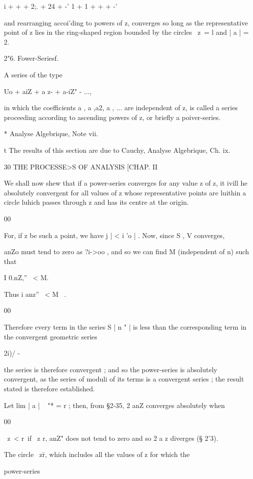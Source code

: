 i + + + 2;. + 24 + -' 1 + 1 + + + -'

and rearranging accoi'ding to powers of z, converges so long as the
representative point of z lies in the ring-shaped region bounded by
the circles \ z\ = l and | a | = 2.

2"6. Fower-Seriesf.

A series of the type

Uo + aiZ + a z- + a-iZ" - ...,

in which the coefficients a , a ,a2, a , ... are independent of z, is
called a series proceeding according to ascending powers of z, or
briefly a poiver-series.

* Analyse Algebrique, Note vii.

t The results of this section are due to Cauchy, Analyse Algebrique,
Ch. ix.



  30 THE PROCESSE>S OF ANALYSIS [CHAP. II

We shall now shew that if a power-series converges for any value z of
z, it ivill he absolutely convergent for all values of z whose
representative points are luithin a circle luhich passes through z and
has its centre at the origin.

00

For, if z be such a point, we have j | < i 'o | . Now, since S , V
converges,

anZo must tend to zero as ?i->oo , and so we can find M (independent
of n) such that

I 0.nZ,'' \ < M.

Thus i anz'' \ < M \ .

00

Therefore every term in the series S | n " | is less than the
corresponding term in the convergent geometric series

2i)/ -

the series is therefore convergent ; and so the power-series is
absolutely convergent, as the series of moduli of its terms is a
convergent series ; the result stated is therefore established.

Let lim | a | ~ "* = r ; then, from §2-35, 2 anZ converges absolutely
when

00

\ z\ < r\ if \ z r, anZ" does not tend to zero and so 2 a z diverges
(§ 2'3).

The circle \ z\=r, which includes all the values of z for which the

power-series

